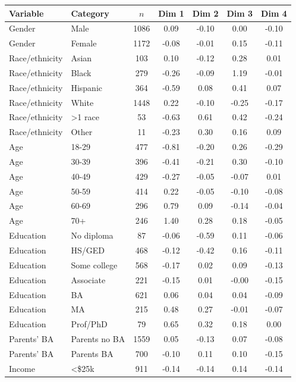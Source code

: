 \begin{tabular}{llccccc}
\toprule
Variable & Category & $n$ & Dim 1 & Dim 2 & Dim 3 & Dim 4 \\
\midrule
Gender & Male & 1086 & 0.09 & -0.10 & 0.00 & -0.10 \\
Gender & Female & 1172 & -0.08 & -0.01 & 0.15 & -0.11 \\
\addlinespace
Race/ethnicity & Asian & 103 & 0.10 & -0.12 & 0.28 & 0.01 \\
Race/ethnicity & Black & 279 & -0.26 & -0.09 & 1.19 & -0.01 \\
Race/ethnicity & Hispanic & 364 & -0.59 & 0.08 & 0.41 & 0.07 \\
Race/ethnicity & White & 1448 & 0.22 & -0.10 & -0.25 & -0.17 \\
Race/ethnicity & >1 race & 53 & -0.63 & 0.61 & 0.42 & -0.24 \\
Race/ethnicity & Other & 11 & -0.23 & 0.30 & 0.16 & 0.09 \\
\addlinespace
Age & 18-29 & 477 & -0.81 & -0.20 & 0.26 & -0.29 \\
Age & 30-39 & 396 & -0.41 & -0.21 & 0.30 & -0.10 \\
Age & 40-49 & 429 & -0.27 & -0.05 & -0.07 & 0.01 \\
Age & 50-59 & 414 & 0.22 & -0.05 & -0.10 & -0.08 \\
Age & 60-69 & 296 & 0.79 & 0.09 & -0.14 & -0.04 \\
Age & 70+ & 246 & 1.40 & 0.28 & 0.18 & -0.05 \\
\addlinespace
Education & No diploma & 87 & -0.06 & -0.59 & 0.11 & -0.06 \\
Education & HS/GED & 468 & -0.12 & -0.42 & 0.16 & -0.11 \\
Education & Some college & 568 & -0.17 & 0.02 & 0.09 & -0.13 \\
Education & Associate & 221 & -0.15 & 0.01 & -0.00 & -0.15 \\
Education & BA & 621 & 0.06 & 0.04 & 0.04 & -0.09 \\
Education & MA & 215 & 0.48 & 0.27 & -0.01 & -0.07 \\
Education & Prof/PhD & 79 & 0.65 & 0.32 & 0.18 & 0.00 \\
\addlinespace
Parents' BA & Parents no BA & 1559 & 0.05 & -0.13 & 0.07 & -0.08 \\
Parents' BA & Parents BA & 700 & -0.10 & 0.11 & 0.10 & -0.15 \\
\addlinespace
Income & <\$25k & 911 & -0.14 & -0.14 & 0.14 & -0.14 \\

\end{tabular}
